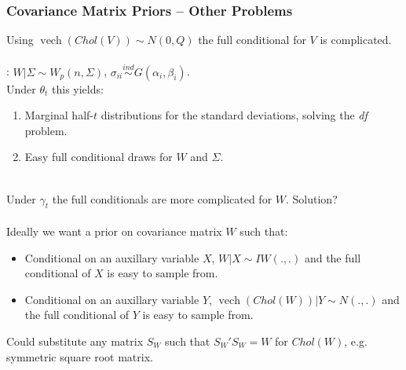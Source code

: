 \documentclass[xcolor=dvipsnames]{beamer}
\DeclareMathOperator{\vech}{vech}
\begin{document}
\begin{frame}
\frametitle{Covariance Matrix Priors -- Other Problems}
Using $\vech(Chol(V))\sim N(0,Q)$ the full conditional for $V$ is complicated.\\~\\

\pause\citet{huang2013simple}: $W|\Sigma\sim W_p(n,\Sigma)$, $\sigma_{ii}\stackrel{ind}{\sim} G(\alpha_i,\beta_i)$. \\

Under $\theta_t$ this yields:
\begin{enumerate}
\item Marginal half-$t$ distributions for the standard deviations, solving the {\it df} problem.
\item Easy full conditional draws for $W$ and $\Sigma$.\\~
\end{enumerate}

\pause Under $\gamma_t$ the full conditionals are more complicated for $W$.  Solution?\\~\\

\pause Ideally we want a prior on covariance matrix $W$ such that:
\begin{itemize}
\item Conditional on an auxillary variable $X$, $W|X \sim IW(.,.)$ and the full conditional of $X$ is easy to sample from.
\item Conditional on an auxillary variable $Y$, $\vech(Chol(W))|Y \sim N(.,.)$ and the full conditional of $Y$ is easy to sample from.
\end{itemize}
\pause Could substitute any matrix $S_W$ such that $S_W'S_W=W$ for $Chol(W)$, e.g. symmetric square root matrix.
\end{frame}
\end{document}

